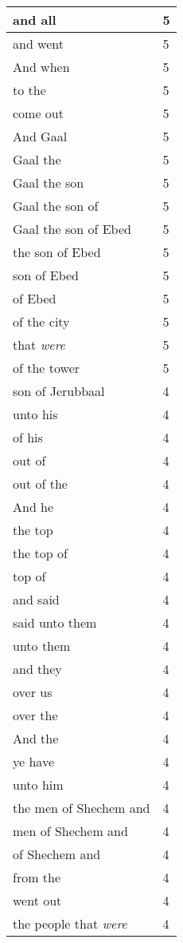 \begin{center}
\begin{longtable}{|p{3.0in}|p{0.5in}|}
and all & 5\\ \hline 
and went & 5\\ \hline 
And when & 5\\ \hline 
to the & 5\\ \hline 
come out & 5\\ \hline 
And Gaal & 5\\ \hline 
Gaal the & 5\\ \hline 
Gaal the son & 5\\ \hline 
Gaal the son of & 5\\ \hline 
Gaal the son of Ebed & 5\\ \hline 
the son of Ebed & 5\\ \hline 
son of Ebed & 5\\ \hline 
of Ebed & 5\\ \hline 
of the city & 5\\ \hline 
that \emph{were} & 5\\ \hline 
of the tower & 5\\ \hline 
son of Jerubbaal & 4\\ \hline 
unto his & 4\\ \hline 
of his & 4\\ \hline 
out of & 4\\ \hline 
out of the & 4\\ \hline 
And he & 4\\ \hline 
the top & 4\\ \hline 
the top of & 4\\ \hline 
top of & 4\\ \hline 
and said & 4\\ \hline 
said unto them & 4\\ \hline 
unto them & 4\\ \hline 
and they & 4\\ \hline 
over us & 4\\ \hline 
over the & 4\\ \hline 
And the & 4\\ \hline 
ye have & 4\\ \hline 
unto him & 4\\ \hline 
the men of Shechem and & 4\\ \hline 
men of Shechem and & 4\\ \hline 
of Shechem and & 4\\ \hline 
from the & 4\\ \hline 
went out & 4\\ \hline 
the people that \emph{were} & 4\\ \hline 

\end{longtable}
\end{center}
